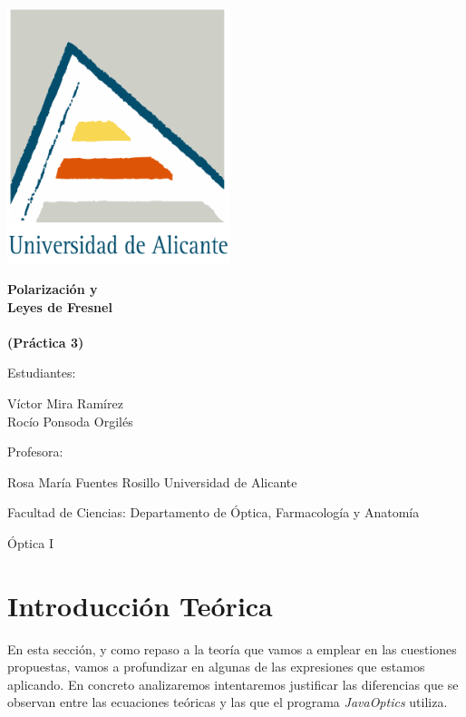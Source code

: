 \documentclass[11pt]{article}
\newcommand{\titulo}{Polarización y\\ Leyes de Fresnel \\\ \\(Práctica 3)}
\newcommand{\nombreestudiante}{Víctor Mira Ramírez\\ Rocío Ponsoda Orgilés}
\newcommand{\nombredirector}{Rosa María Fuentes Rosillo}
\newcommand{\fecha}{\date{Diciembre 2023}}
\begin{document}
    \begin{titlepage}
    	\centering
    	\includegraphics[width=65mm]{fotos/logoUA.png}\par
    	\vspace{1cm}
    	{\huge\bfseries \vspace{15mm} \titulo \par}
    	\vfill
    	{\large 
    	\vfill
    	Estudiantes:\par\vspace{2mm}
    	\nombreestudiante\par
    	\vfill
    	Profesora:\par\vspace{2mm}
        \nombredirector
        \vfill
        Universidad de Alicante\par
        Facultad de Ciencias: Departamento de Óptica, Farmacología y Anatomía\par
        Óptica I\par
    	\fecha\par}
    \end{titlepage}
    
    \clearpage
    \tableofcontents
    \clearpage
    \section{Introducción Teórica}
    \noindent En esta sección, y como repaso a la teoría que vamos a emplear en las cuestiones propuestas, vamos a profundizar en algunas de las expresiones que estamos aplicando. En concreto analizaremos intentaremos justificar las diferencias que se observan entre las ecuaciones teóricas y las que el programa \textit{JavaOptics} utiliza.
\end{document}
